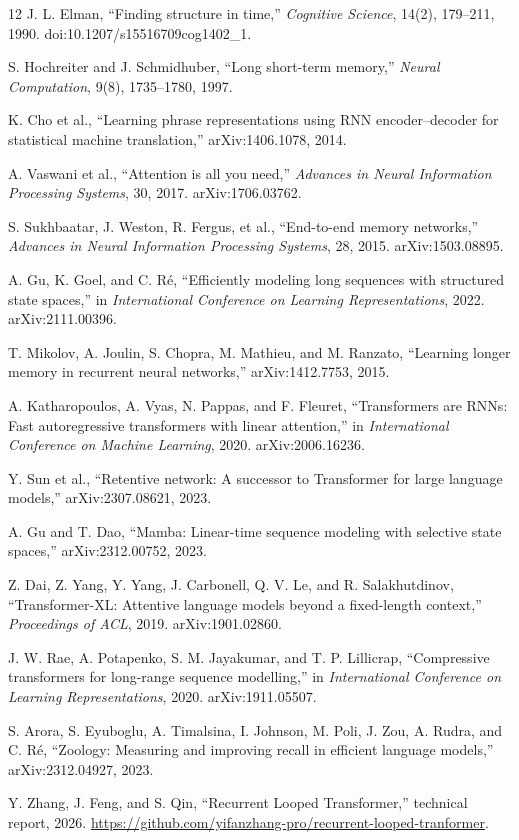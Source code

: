 \documentclass{article}
\begin{document}
\begin{thebibliography}{12}
J. L. Elman, ``Finding structure in time,'' \emph{Cognitive Science},
14(2), 179--211, 1990. doi:10.1207/s15516709cog1402\_1.

S. Hochreiter and J. Schmidhuber, ``Long short-term memory,''
\emph{Neural Computation}, 9(8), 1735--1780, 1997.

K. Cho et al., ``Learning phrase representations using RNN encoder--decoder
for statistical machine translation,'' arXiv:1406.1078, 2014.

A. Vaswani et al., ``Attention is all you need,''
\emph{Advances in Neural Information Processing Systems}, 30, 2017.
arXiv:1706.03762.

S. Sukhbaatar, J. Weston, R. Fergus, et al., ``End-to-end memory networks,''
\emph{Advances in Neural Information Processing Systems}, 28, 2015.
arXiv:1503.08895.

A. Gu, K. Goel, and C. Ré, ``Efficiently modeling long sequences with
structured state spaces,'' in \emph{International Conference on Learning
Representations}, 2022. arXiv:2111.00396.

T. Mikolov, A. Joulin, S. Chopra, M. Mathieu, and M. Ranzato,
``Learning longer memory in recurrent neural networks,'' arXiv:1412.7753, 2015.

A. Katharopoulos, A. Vyas, N. Pappas, and F. Fleuret,
``Transformers are RNNs: Fast autoregressive transformers with linear attention,''
in \emph{International Conference on Machine Learning}, 2020. arXiv:2006.16236.

Y. Sun et al., ``Retentive network: A successor to Transformer for large
language models,'' arXiv:2307.08621, 2023.

A. Gu and T. Dao, ``Mamba: Linear-time sequence modeling with selective state
spaces,'' arXiv:2312.00752, 2023.

Z. Dai, Z. Yang, Y. Yang, J. Carbonell, Q. V. Le, and R. Salakhutdinov,
``Transformer-XL: Attentive language models beyond a fixed-length context,''
\emph{Proceedings of ACL}, 2019. arXiv:1901.02860.

J. W. Rae, A. Potapenko, S. M. Jayakumar, and T. P. Lillicrap,
``Compressive transformers for long-range sequence modelling,'' in
\emph{International Conference on Learning Representations}, 2020.
arXiv:1911.05507.

S. Arora, S. Eyuboglu, A. Timalsina, I. Johnson, M. Poli, J. Zou,
A. Rudra, and C. Ré, ``Zoology: Measuring and improving recall in efficient
language models,'' arXiv:2312.04927, 2023.

Y. Zhang, J. Feng, and S. Qin, ``Recurrent Looped Transformer,'' technical
report, 2026. \url{https://github.com/yifanzhang-pro/recurrent-looped-tranformer}.
\end{thebibliography}
\end{document}
